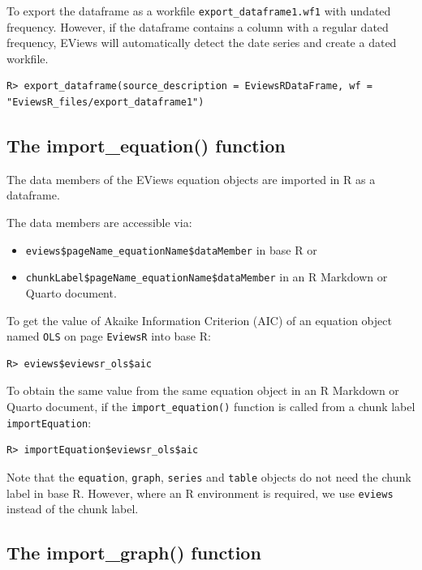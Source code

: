 To export the dataframe as a workfile \texttt{export\_dataframe1.wf1} with undated frequency. However, if the dataframe contains a column with a regular dated frequency, EViews will automatically detect the date series and create a dated workfile.

\begin{verbatim}
R> export_dataframe(source_description = EviewsRDataFrame, wf = "EviewsR_files/export_dataframe1")
\end{verbatim}

\hypertarget{the-import_equation-function}{%
\subsection{The import\_equation() function}\label{the-import_equation-function}}

The data members of the EViews equation objects are imported in R as a dataframe.

The data members are accessible via:

\begin{itemize}
\item
  \texttt{eviews\$pageName\_equationName\$dataMember} in base R or
\item
  \texttt{chunkLabel\$pageName\_equationName\$dataMember} in an R Markdown or Quarto document.
\end{itemize}

To get the value of Akaike Information Criterion (AIC) of an equation object named \texttt{OLS} on page \texttt{EviewsR} into base R:

\begin{verbatim}
R> eviews$eviewsr_ols$aic
\end{verbatim}

To obtain the same value from the same equation object in an R Markdown or Quarto document, if the \texttt{import\_equation()} function is called from a chunk label \texttt{importEquation}:

\begin{verbatim}
R> importEquation$eviewsr_ols$aic
\end{verbatim}

Note that the \texttt{equation}, \texttt{graph}, \texttt{series} and \texttt{table} objects do not need the chunk label in base R. However, where an R environment is required, we use \texttt{eviews} instead of the chunk label.

\hypertarget{the-import_graph-function}{%
\subsection{The import\_graph() function}\label{the-import_graph-function}}

